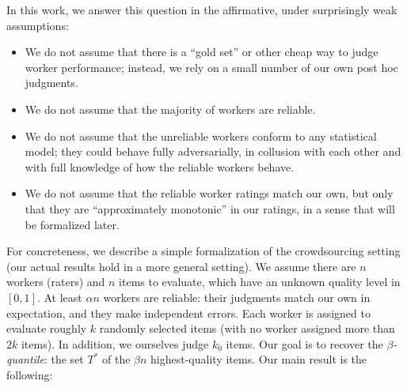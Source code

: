 In this work, we answer this question in the affirmative, under surprisingly 
weak assumptions:
\begin{itemize}
\item We do not assume that there is a ``gold set'' or other cheap way to judge 
      worker performance; instead, we rely on a small number of our own post hoc judgments.
\item We do not assume that the majority of workers are reliable.
\item We do not assume that the unreliable workers conform to any statistical 
      model; they could behave fully adversarially, in collusion with each other 
      and with full knowledge of how the reliable workers behave.
\item We do not assume that the reliable worker ratings match our own, but only that they are 
      ``approximately monotonic'' in our ratings, in a sense that will be 
      formalized later.
\end{itemize}
For concreteness, we describe a simple formalization of the crowdsourcing 
setting (our actual results hold in a more general setting). We assume 
there are $n$ workers (raters) and $n$ items to evaluate, which have an unknown 
quality level in $[0,1]$. At least $\alpha n$ workers are reliable:
their judgments match our own in expectation, and they make independent errors.
Each worker is assigned to evaluate roughly $k$ randomly selected items (with no worker assigned more than $2k$ items). In addition, we ourselves judge $k_0$ items. Our goal is to 
recover the \emph{$\beta$-quantile}: the set $T^*$ of the $\beta n$ highest-quality items. 
Our main result is the following:



